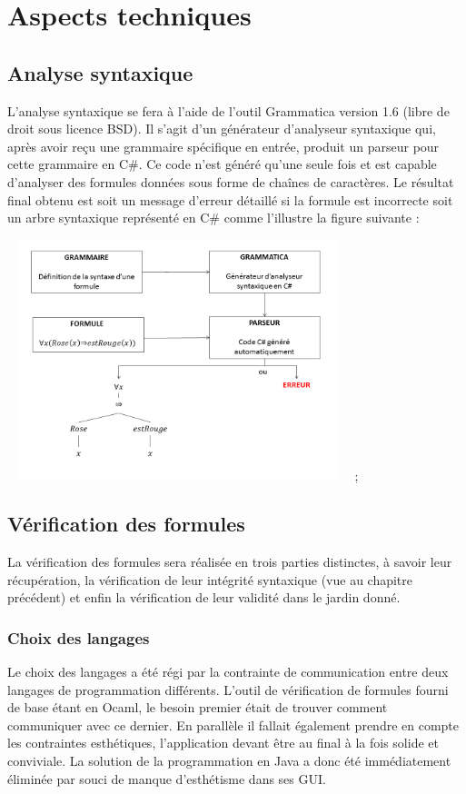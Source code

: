 \documentclass{article}
\theoremstyle{plain}
\theoremstyle{remark}
\begin{document}
\section{Aspects techniques}
\subsection{Analyse syntaxique}

L'analyse syntaxique se fera à l'aide de l'outil Grammatica version
1.6 (libre de droit sous licence BSD). Il s'agit d'un générateur
d'analyseur syntaxique qui, après avoir reçu une grammaire spécifique
en entrée, produit un parseur pour cette grammaire en C\#. Ce code
n'est généré qu'une seule fois et est capable d'analyser des formules
données sous forme de chaînes de caractères. Le résultat final obtenu
est soit un message d'erreur détaillé si la formule est incorrecte
soit un arbre syntaxique représenté en C\# comme l'illustre la figure
suivante :

\begin{center}
\includegraphics[width=100mm, height=70mm]{syntaxtree} ;
\end{center}

\subsection{Vérification des formules}
La vérification des formules sera réalisée en trois parties
distinctes, à savoir leur récupération, la vérification de leur
intégrité syntaxique (vue au chapitre précédent) et enfin la
vérification de leur validité dans le jardin donné.

\subsubsection{Choix des langages}
Le choix des langages a été régi par la contrainte de communication
entre deux langages de programmation différents. L'outil de
vérification de formules fourni de base étant en Ocaml, le besoin
premier était de trouver comment communiquer avec ce dernier.  En
parallèle il fallait également prendre en compte les contraintes
esthétiques, l'application devant être au final à la fois solide et
conviviale. La solution de la programmation en Java a donc été
immédiatement éliminée par souci de manque d'esthétisme dans ses GUI.
\end{document}
